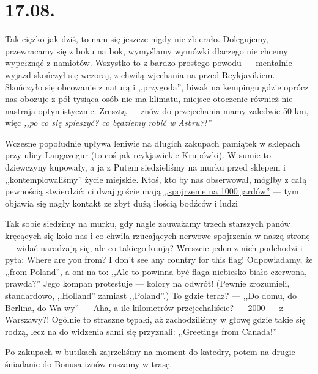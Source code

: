\chapter*{17.08.}

Tak ciężko jak dziś, to nam się jeszcze nigdy nie zbierało. Dolegujemy, przewracamy się z boku na bok, wymyślamy wymówki dlaczego nie chcemy wypełznąć z namiotów. Wszystko to z bardzo prostego powodu --- mentalnie wyjazd skończył się wczoraj, z chwilą wjechania na  przed Reykjavikiem. Skończyło się obcowanie z naturą i ,,przygoda'', biwak na kempingu gdzie oprócz nas obozuje z pół tysiąca osób nie ma klimatu, miejsce otoczenie również nie nastraja optymistycznie. Zresztą --- znów do przejechania mamy zaledwie 50 km, więc \emph{,,po co się spieszyć? co będziemy robić w Asbru?!''}

Wczesne popołudnie upływa leniwie na długich zakupach pamiątek w sklepach przy ulicy Laugavegur (to coś jak reykjawickie Krupówki). W sumie to dziewczyny kupowały, a ja z Putem siedzieliśmy na murku przed sklepem i ,,kontemplowaliśmy'' życie miejskie. Ktoś, kto by nas obserwował, mógłby z całą pewnością stwierdzić: ci dwaj goście mają \href{http://en.wikipedia.org/wiki/Thousand-yard_stare}{,,spojrzenie na 1000 jardów''} --- tym objawia się nagły kontakt ze zbyt dużą ilością bodźców i ludzi\textellipsis


Tak sobie siedzimy na murku, gdy nagle zauważamy trzech starszych panów kręcących się koło nas i co chwila rzucających nerwowe spojrzenia w naszą stronę --- widać naradzają się, ale co takiego knują? Wreszcie jeden z nich podchodzi i pyta: Where are you from? I don’t see any country for this flag! Odpowiadamy, że ,,from Poland'', a oni na to: ,,Ale to powinna być flaga niebiesko-biało-czerwona, prawda?'' Jego kompan protestuje --- kolory na odwrót! (Pewnie zrozumieli, standardowo, ,,Holland'' zamiast ,,Poland''.) To gdzie teraz? --- ,,Do domu, do Berlina, do Wa-wy\textellipsis'' --- Aha, a ile kilometrów przejechaliście? --- 2000 --- z Warszawy?! Ogólnie to straszne tępaki, aż zachodziliśmy w głowę gdzie takie się rodzą, lecz na do widzenia sami się przyznali: ,,Greetings from Canada!''

Po zakupach w butikach zajrzeliśmy na moment do katedry, potem na drugie śniadanie do Bonusa i\textellipsis znów ruszamy w trasę.

